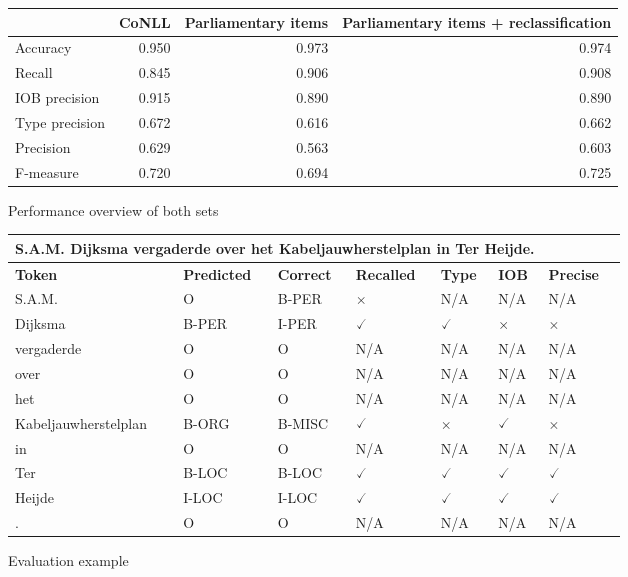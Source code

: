 \begin{figure}
\begin{center}
\begin{tabular}{l||r|r|r|}
     & \multicolumn{1}{l|}{\textbf{CoNLL}} & \multicolumn{1}{l|}{\textbf{Parliamentary items}} & \multicolumn{1}{m{4cm}|}{\textbf{Parliamentary items + reclassification}} \\\hline \hline
Accuracy & 0.950 & 0.973 & 0.974 \\\hline
Recall & 0.845 & 0.906 & 0.908\\\hline 
IOB precision & 0.915 & 0.890 & 0.890 \\\hline 
Type precision & 0.672 & 0.616 & 0.662\\\hline 
Precision & 0.629 & 0.563 & 0.603\\\hline
F-measure & 0.720 & 0.694 & 0.725\\\hline
 \end{tabular}
\caption{Performance overview of both sets}
\label{fig:performance}
\end{center}
\end{figure}

\begin{figure}
\begin{center}
\begin{tabular}{|l||l|l|l|l|l|l|l|}
\multicolumn{6}{l}{\large{S.A.M. Dijksma vergaderde over het Kabeljauwherstelplan in Ter Heijde.}} \\\hline
\multicolumn{1}{|l|}{\textbf{Token}} & \multicolumn{1}{l|}{\textbf{Predicted}} & \multicolumn{1}{l|}{\textbf{Correct}} & \textbf{Recalled} & \textbf{Type} & \textbf{IOB} & \textbf{Precise} \\\hline \hline
S.A.M. & O & B-PER & $\times$ & N/A & N/A & N/A \\\hline 
Dijksma & B-PER & I-PER & $\checked$ & $\checked$ & $\times$ & $\times$\\\hline 
vergaderde & O & O & N/A & N/A & N/A & N/A\\\hline 
over & O & O & N/A & N/A & N/A & N/A\\\hline  
het & O & O & N/A & N/A & N/A & N/A\\\hline 
Kabeljauwherstelplan & B-ORG & B-MISC & $\checked$ & $\times$ & $\checked$ & $\times$\\\hline 
in & O & O & N/A & N/A & N/A & N/A\\\hline 
Ter & B-LOC & B-LOC & $\checked$ & $\checked$ & $\checked$ & $\checked$\\\hline 
Heijde & I-LOC & I-LOC & $\checked$ & $\checked$ & $\checked$ & $\checked$\\\hline 
. & O & O & N/A & N/A & N/A & N/A\\\hline
\end{tabular}
\caption{Evaluation example}
\label{fig:eval_example}
\end{center}
\end{figure}

